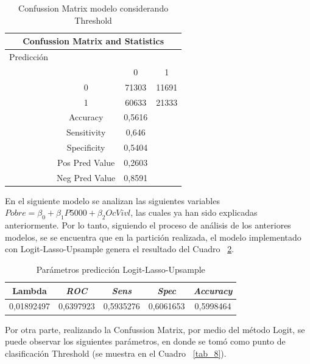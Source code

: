 \documentclass[conference, 10pt]{IEEEtran}
\begin{document}
\begin{table}[htbp]
\caption{Confussion Matrix modelo considerando Threshold }
\begin{center}
\begin{tabular}{|c c c c|}
\hline
\multicolumn{4}{|c|}{\textbf{Confussion Matrix and Statistics}} \\
\cline{1-4} 
\hline
 Predicción&& &\\
 & &0&1\\
 &0&71303&11691\\
  &1&60633&21333\\
	\hline
&{Accuracy}&0,5616& \\
	&{Sensitivity} &0,646& \\
&{Specificity} &0,5404& \\
&{Pos Pred Value}&0,2603& \\
& {Neg Pred Value} &0,8591& \\
\hline
\end{tabular}
\label{tab_6}
\end{center}
\end{table}

En el siguiente modelo se analizan las siguientes variables $Pobre = \beta_0+\beta_{1}P5000 +\beta_{2}OcVivl$, las cuales ya han sido explicadas anteriormente. Por lo tanto, siguiendo el proceso de análisis de los anteriores modelos, se se encuentra que en la partición realizada, el modelo implementado con Logit-Lasso-Upsample genera el resultado del Cuadro ~\ref{tab_7}.

\begin{table}[htbp]
\caption{Parámetros predicción Logit-Lasso-Upsample}
\begin{center}
\begin{tabular}{|c|c|c|c|c|}
\hline
\textbf{Lambda} & \textbf{\textit{ROC}}& \textbf{\textit{Sens}} & \textbf{\textit{Spec}}& \textbf{\textit{Accuracy}}\\
\hline
0,01892497& 0,6397923   &0,5935276  &0,6061653 &0,5998464  \\
\hline
\end{tabular}
\label{tab_7}
\end{center}
\end{table}

Por otra parte, realizando la Confussion Matrix, por medio del método Logit, se puede observar los siguientes parámetros, en donde se tomó como punto de clasificación Threshold (se muestra en el Cuadro ~\ref{tab_8}).
\end{document}

